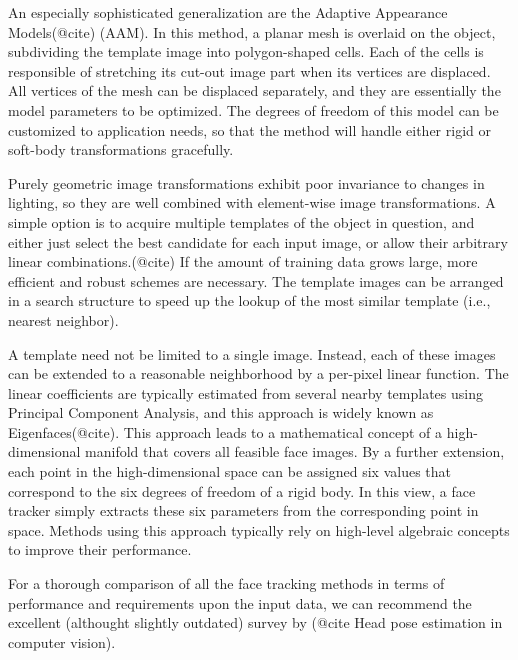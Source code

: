 An especially sophisticated generalization are the Adaptive Appearance Models(@cite) (AAM).
In this method, a planar mesh is overlaid on the object, subdividing the template image into polygon-shaped cells.
Each of the cells is responsible of stretching its cut-out image part when its vertices are displaced.
All vertices of the mesh can be displaced separately, and they are essentially the model parameters to be optimized.
The degrees of freedom of this model can be customized to application needs, so that the method will handle either rigid or soft-body transformations gracefully.

Purely geometric image transformations exhibit poor invariance to changes in lighting, so they are well combined with element-wise image transformations.
A simple option is to acquire multiple templates of the object in question, and either just select the best candidate for each input image, or allow their arbitrary linear combinations.(@cite)
If the amount of training data grows large, more efficient and robust schemes are necessary.
The template images can be arranged in a search structure to speed up the lookup of the most similar template (i.e., nearest neighbor).

A template need not be limited to a single image.
Instead, each of these images can be extended to a reasonable neighborhood by a per-pixel linear function.
The linear coefficients are typically estimated from several nearby templates using Principal Component Analysis, and this approach is widely known as Eigenfaces(@cite).
This approach leads to a mathematical concept of a high-dimensional manifold that covers all feasible face images.
By a further extension, each point in the high-dimensional space can be assigned six values that correspond to the six degrees of freedom of a rigid body.
In this view, a face tracker simply extracts these six parameters from the corresponding point in space.
Methods using this approach typically rely on high-level algebraic concepts to improve their performance.



For a thorough comparison of all the face tracking methods in terms of performance and requirements upon the input data, we can recommend the excellent (althought slightly outdated) survey by (@cite Head pose estimation in computer vision).

